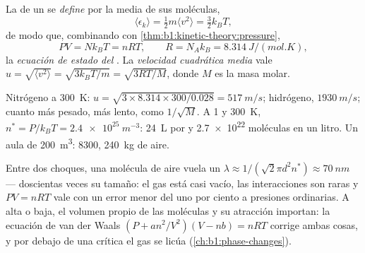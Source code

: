 \begin{definition}\label{def:b1:kinetic-theory:kinetictemp}
La  de un  se \emph{define} por la 
media de sus moléculas,
\[
\langle\epsilon_k\rangle = \tfrac12 m\langle v^2\rangle = \tfrac32 k_BT ,
\]
de modo que, combinando con \cref{thm:b1:kinetic-theory:pressure},
\[
PV = Nk_BT = nRT, \qquad R = N_Ak_B = \qty{8.314}{J/(mol.K)} ,
\]
la \emph{ecuación de estado del }. La \emph{velocidad
cuadrática media} vale $u = \sqrt{\langle v^2\rangle} = \sqrt{3k_BT/m} = \sqrt{3RT/M}$,
donde $M$ es la masa molar.
\end{definition}

\begin{example}\label{ex:b1:kinetic-theory:air}
Nitrógeno a \qty{300}{K}: $u = \sqrt{3 \times 8.314 \times 300/0.028} =
\qty{517}{m/s}$; hidrógeno, $\qty{1930}{m/s}$; cuanto más pesado, más
lento, como $1/\sqrt M$. A \qty{1}{} y \qty{300}{K}, $n^* = P/k_BT = \qty{2.4e25}{m^{-3}}$:
\qty{24}{L} por  y \qty{2.7e22}{} moléculas en un litro. Un aula de
\qty{200}{m^3}: \qty{8300}{}, \qty{240}{kg} de aire.
\end{example}

\begin{remark}\label{rem:b1:kinetic-theory:validity}
Entre dos choques, una molécula de aire vuela un \emph{} $\lambda \approx 1/(\sqrt2\pi d^2n^*) \approx \qty{70}{nm}$ ---
doscientas veces su tamaño: el gas está casi vacío, las interacciones son
raras y $PV = nRT$ vale con un error menor del uno por ciento a presiones
ordinarias. A  alta o  baja, el volumen propio de las
moléculas y su atracción importan: la ecuación de van der Waals
$(P + an^2/V^2)(V - nb) = nRT$ corrige ambas cosas, y por debajo de una
 crítica el gas se licúa (\cref{ch:b1:phase-changes}).
\end{remark}

